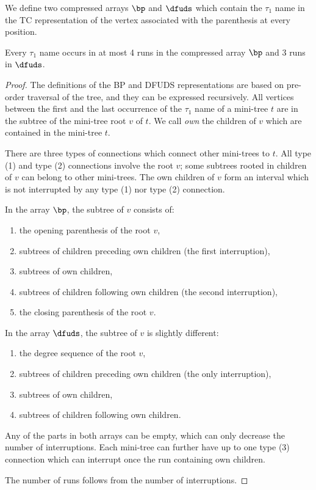 We define two compressed arrays $\bp$ and $\dfuds$ which contain the $\tau_1$ name in the TC representation of the vertex associated with the parenthesis at every position.

\begin{lemma}\label{l:usr-runs}
	Every $\tau_1$ name occurs in at most 4 runs in the compressed array $\bp$ and 3 runs in $\dfuds$.
\end{lemma}
\begin{proof}
	The definitions of the BP and DFUDS representations are based on pre-order traversal of the tree, and they can be expressed recursively.
	All vertices between the first and the last occurrence of the $\tau_1$ name of a mini-tree $t$ are in the subtree of the mini-tree root $v$ of $t$.
	We call \emph{own} the children of $v$ which are contained in the mini-tree $t$.
	
	There are three types of connections which connect other mini-trees to $t$.
	All type (1) and type (2) connections involve the root $v$; some subtrees rooted in children of $v$ can belong to other mini-trees.
	The own children of $v$ form an interval which is not interrupted by any type (1) nor type (2) connection.
	
	In the array $\bp$, the subtree of $v$ consists of:
	\begin{enumerate}
		\item the opening parenthesis of the root $v$,
		\item subtrees of children preceding own children (the first interruption),
		\item subtrees of own children,
		\item subtrees of children following own children (the second interruption),
		\item the closing parenthesis of the root $v$.
	\end{enumerate}
	
	In the array $\dfuds$, the subtree of $v$ is slightly different:
	\begin{enumerate}
		\item the degree sequence of the root $v$,
		\item subtrees of children preceding own children (the only interruption),
		\item subtrees of own children,
		\item subtrees of children following own children.
	\end{enumerate}
	
	Any of the parts in both arrays can be empty, which can only decrease the number of interruptions.
	Each mini-tree can further have up to one type (3) connection which can interrupt once the run containing own children.
	
	The number of runs follows from the number of interruptions.
\end{proof}


